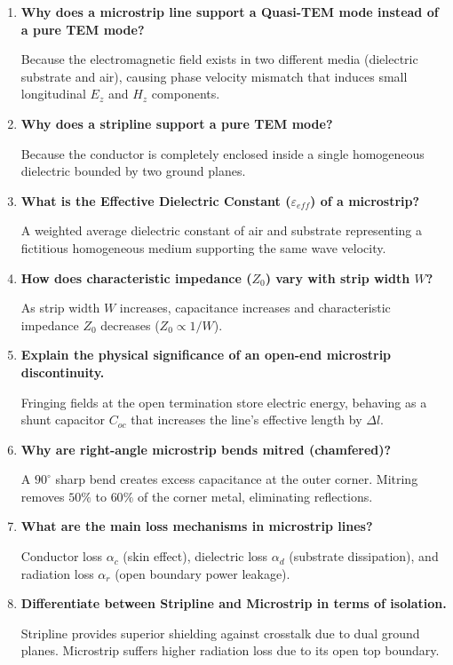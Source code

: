 \documentclass[12pt,a4paper]{article}
\newcommand{\Q}[1]{\textbf{#1}\par\noindent\ignorespaces}
\begin{document}
\begin{tcolorbox}[exambox, title={\textbf{Frequently Asked / Viva Questions}}]
  \begin{enumerate}[topsep=0pt, label=\textbf{Q\arabic*.}, itemsep=5pt]
    \item \Q{Why does a microstrip line support a Quasi-TEM mode instead of a pure TEM mode?}
    Because the electromagnetic field exists in two different media (dielectric substrate and air), causing phase velocity mismatch that induces small longitudinal $E_z$ and $H_z$ components.

    \item \Q{Why does a stripline support a pure TEM mode?}
    Because the conductor is completely enclosed inside a single homogeneous dielectric bounded by two ground planes.

    \item \Q{What is the Effective Dielectric Constant ($\varepsilon_{eff}$) of a microstrip?}
    A weighted average dielectric constant of air and substrate representing a fictitious homogeneous medium supporting the same wave velocity.

    \item \Q{How does characteristic impedance ($Z_0$) vary with strip width $W$?}
    As strip width $W$ increases, capacitance increases and characteristic impedance $Z_0$ decreases ($Z_0 \propto 1/W$).

    \item \Q{Explain the physical significance of an open-end microstrip discontinuity.}
    Fringing fields at the open termination store electric energy, behaving as a shunt capacitor $C_{oc}$ that increases the line's effective length by $\Delta l$.

    \item \Q{Why are right-angle microstrip bends mitred (chamfered)?}
    A $90^\circ$ sharp bend creates excess capacitance at the outer corner. Mitring removes $50\%$ to $60\%$ of the corner metal, eliminating reflections.

    \item \Q{What are the main loss mechanisms in microstrip lines?}
    Conductor loss $\alpha_c$ (skin effect), dielectric loss $\alpha_d$ (substrate dissipation), and radiation loss $\alpha_r$ (open boundary power leakage).

    \item \Q{Differentiate between Stripline and Microstrip in terms of isolation.}
    Stripline provides superior shielding against crosstalk due to dual ground planes. Microstrip suffers higher radiation loss due to its open top boundary.


\end{enumerate}
\end{tcolorbox}
\end{document}
